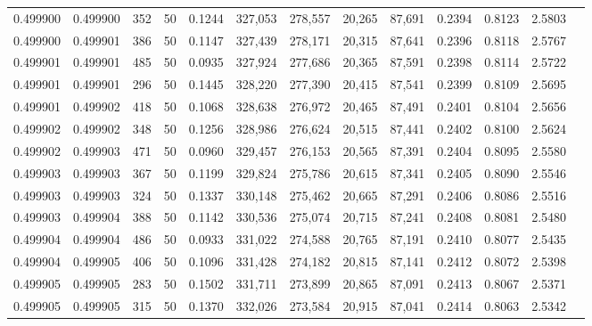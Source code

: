 \begin{tabular}{rrrrrrrrrrrrr}
0.499900 & 0.499900 &   352 &  50 &                                     0.1244 & 327,053 & 278,557 &  20,265 &  87,691 & 0.2394 & 0.8123 & 2.5803 \\
0.499900 & 0.499901 &   386 &  50 &                                     0.1147 & 327,439 & 278,171 &  20,315 &  87,641 & 0.2396 & 0.8118 & 2.5767 \\
0.499901 & 0.499901 &   485 &  50 &                                     0.0935 & 327,924 & 277,686 &  20,365 &  87,591 & 0.2398 & 0.8114 & 2.5722 \\
0.499901 & 0.499901 &   296 &  50 &                                     0.1445 & 328,220 & 277,390 &  20,415 &  87,541 & 0.2399 & 0.8109 & 2.5695 \\
0.499901 & 0.499902 &   418 &  50 &                                     0.1068 & 328,638 & 276,972 &  20,465 &  87,491 & 0.2401 & 0.8104 & 2.5656 \\
0.499902 & 0.499902 &   348 &  50 &                                     0.1256 & 328,986 & 276,624 &  20,515 &  87,441 & 0.2402 & 0.8100 & 2.5624 \\
0.499902 & 0.499903 &   471 &  50 &                                     0.0960 & 329,457 & 276,153 &  20,565 &  87,391 & 0.2404 & 0.8095 & 2.5580 \\
0.499903 & 0.499903 &   367 &  50 &                                     0.1199 & 329,824 & 275,786 &  20,615 &  87,341 & 0.2405 & 0.8090 & 2.5546 \\
0.499903 & 0.499903 &   324 &  50 &                                     0.1337 & 330,148 & 275,462 &  20,665 &  87,291 & 0.2406 & 0.8086 & 2.5516 \\
0.499903 & 0.499904 &   388 &  50 &                                     0.1142 & 330,536 & 275,074 &  20,715 &  87,241 & 0.2408 & 0.8081 & 2.5480 \\
0.499904 & 0.499904 &   486 &  50 &                                     0.0933 & 331,022 & 274,588 &  20,765 &  87,191 & 0.2410 & 0.8077 & 2.5435 \\
0.499904 & 0.499905 &   406 &  50 &                                     0.1096 & 331,428 & 274,182 &  20,815 &  87,141 & 0.2412 & 0.8072 & 2.5398 \\
0.499905 & 0.499905 &   283 &  50 &                                     0.1502 & 331,711 & 273,899 &  20,865 &  87,091 & 0.2413 & 0.8067 & 2.5371 \\
0.499905 & 0.499905 &   315 &  50 &                                     0.1370 & 332,026 & 273,584 &  20,915 &  87,041 & 0.2414 & 0.8063 & 2.5342 \\

\end{tabular}
